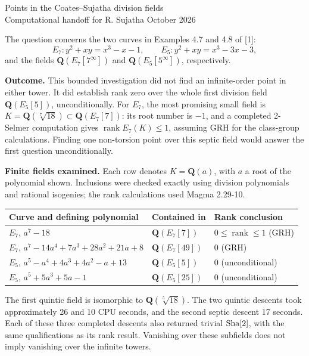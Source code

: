 \documentclass[11pt,a4paper]{article}
\newcommand{\Q}{\mathbf Q}
\newcommand{\rk}{\operatorname{rank}}
\newcommand{\Sha}{\mathop{\textnormal{Sha}}}
\begin{document}
\begin{center}
{\Large Points in the Coates--Sujatha division fields}\\[5pt]
{\normalsize Computational handoff for R. Sujatha  October 2026}
\end{center}
\vspace{-3mm}
The question concerns the two curves in Examples 4.7 and 4.8 of [1]:
\[
 E_7:y^2+xy=x^3-x-1,\qquad E_5:y^2+xy=x^3-3x-3,
\]
and the fields $\Q(E_7[7^\infty])$ and $\Q(E_5[5^\infty])$, respectively.

\textbf{Outcome.} This bounded investigation did not find an infinite-order point in either tower. It did establish rank zero over the whole first division field $\Q(E_5[5])$, unconditionally. For $E_7$, the most promising small field is $K=\Q(\sqrt[7]{18})\subset\Q(E_7[7])$: its root number is $-1$, and a completed 2-Selmer computation gives $\rk E_7(K)\leq1$, assuming GRH for the class-group calculations. Finding one non-torsion point over this septic field would answer the first question unconditionally.

\textbf{Finite fields examined.} Each row denotes $K=\Q(a)$, with $a$ a root of the polynomial shown. Inclusions were checked exactly using division polynomials and rational isogenies; the rank calculations used Magma 2.29-10.

\begin{center}\small
\begin{tabular}{@{}lll@{}}
\toprule
Curve and defining polynomial & Contained in & Rank conclusion\\
\midrule
$E_7$, $a^7-18$ & $\Q(E_7[7])$ & $0\leq\rk\leq1$ (GRH)\\[2pt]
$E_7$, $a^7-14a^4+7a^3+28a^2+21a+8$ & $\Q(E_7[49])$ & $0$ (GRH)\\[2pt]
$E_5$, $a^5-a^4+4a^3+4a^2-a+13$ & $\Q(E_5[5])$ & $0$ (unconditional)\\[2pt]
$E_5$, $a^5+5a^3+5a-1$ & $\Q(E_5[25])$ & $0$ (unconditional)\\
\bottomrule
\end{tabular}
\end{center}
The first quintic field is isomorphic to $\Q(\sqrt[5]{18})$. The two quintic descents took approximately 26 and 10 CPU seconds, and the second septic descent 17 seconds. Each of these three completed descents also returned trivial $\Sha[2]$, with the same qualifications as its rank result. Vanishing over these subfields does not imply vanishing over the infinite towers.
\end{document}
